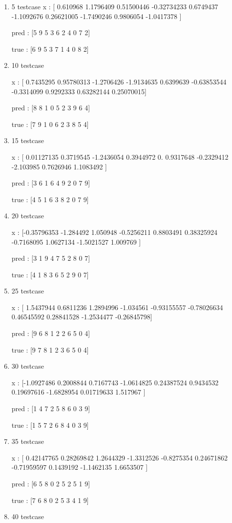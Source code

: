 \documentclass[journal,12pt,onecolumn]{IEEEtran}
\begin{document}
\begin{enumerate}
	\item 5 testcase
x :  [ 0.610968    1.1796409   0.51500446 -0.32734233  0.6749437  -1.1092676
  0.26621005 -1.7490246   0.9806054  -1.0417378 ]

		pred :  [5 9 5 3 6 2 4 0 7 2]

		true :  [6 9 5 3 7 1 4 0 8 2]
\item 10 testcase

	x :  [ 0.7435295   0.95780313 -1.2706426  -1.9134635   0.6399639  -0.63853544
 -0.3314099   0.9292333   0.63282144  0.25070015]

		pred :  [8 8 1 0 5 2 3 9 6 4]

		true :  [7 9 1 0 6 2 3 8 5 4]
\item 15 testcase

	x :  [ 0.01127135  0.3719545  -1.2436054   0.3944972   0.          0.9317648
 -0.2329412  -2.103985    0.7626946   1.1083492 ]

		pred :  [3 6 1 6 4 9 2 0 7 9]

		true :  [4 5 1 6 3 8 2 0 7 9]
\item 20 testcase

	x :  [-0.35796353 -1.284492    1.050948   -0.5256211   0.8803491   0.38325924
 -0.7168095   1.0627134  -1.5021527   1.009769  ]

		pred :  [3 1 9 4 7 5 2 8 0 7]

		true :  [4 1 8 3 6 5 2 9 0 7]
\item 25 testcase

	x :  [ 1.5437944   0.6811236   1.2894996  -1.034561   -0.93155557 -0.78026634
  0.46545592  0.28841528 -1.2534477  -0.26845798]

		pred :  [9 6 8 1 2 2 6 5 0 4]

		true :  [9 7 8 1 2 3 6 5 0 4]
\item 30 testcase

	x :  [-1.0927486   0.2008844   0.7167743  -1.0614825   0.24387524  0.9434532
  0.19697616 -1.6828954   0.01719633  1.517967  ]

		pred :  [1 4 7 2 5 8 6 0 3 9]

		true :  [1 5 7 2 6 8 4 0 3 9]
\item 35 testcase

	x :  [ 0.42147765  0.28269842  1.2644329  -1.3312526  -0.8275354   0.24671862
 -0.71959597  0.1439192  -1.1462135   1.6653507 ]

		pred :  [6 5 8 0 2 5 2 5 1 9]

		true :  [7 6 8 0 2 5 3 4 1 9]
\item 40 testcase


\end{enumerate}
\end{document}
